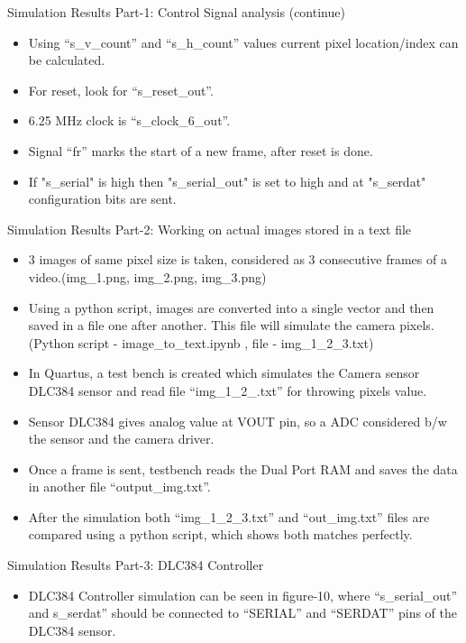 \documentclass{beamer}
\begin{document}
\begin{frame}{Simulation Results Part-1: Control Signal analysis (continue)}
    \begin{itemize}
        \item Using “s\_v\_count” and “s\_h\_count” values current pixel location/index can be calculated.
        \item For reset, look for “s\_reset\_out”.
        \item 6.25 MHz clock is “s\_clock\_6\_out”.
        \item Signal “fr” marks the start of a new frame, after reset is done.
        \item If "s\_serial" is high then "s\_serial\_out" is set to high and at "s\_serdat" configuration bits are sent.
    \end{itemize}
\end{frame}



\begin{frame}{Simulation Results Part-2: Working on actual images stored in a text file}
    \begin{itemize}
        \item 3 images of same pixel size is taken, considered as 3 consecutive frames of a
video.(img\_1.png, img\_2.png, img\_3.png)
        \item Using a python script, images are converted into a single vector and then saved
in a file one after another. This file will simulate the camera pixels.(Python script -
image\_to\_text.ipynb , file - img\_1\_2\_3.txt)
        \item In Quartus, a test bench is created which simulates the Camera sensor DLC384
sensor and read file “img\_1\_2\_.txt” for throwing pixels value.
        \item Sensor DLC384 gives analog value at VOUT pin, so a ADC considered b/w the
sensor and the camera driver.
        \item Once a frame is sent, testbench reads the Dual Port RAM and saves the data in
another file “output\_img.txt”.
        \item After the simulation both “img\_1\_2\_3.txt” and “out\_img.txt” files are compared
using a python script, which shows both matches perfectly.
    \end{itemize}
\end{frame}

\begin{frame}{Simulation Results Part-3: DLC384 Controller}
    \begin{itemize}
        \item DLC384 Controller simulation can be seen in figure-10, where “s\_serial\_out” and
s\_serdat” should be connected to “SERIAL” and “SERDAT” pins of the DLC384 sensor.
    \end{itemize}
\end{frame}
\end{document}

